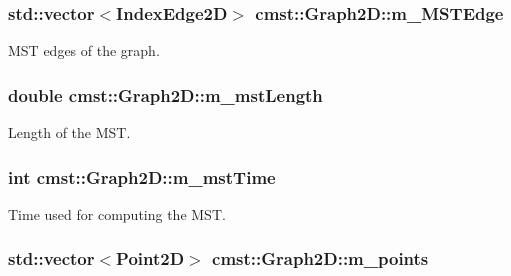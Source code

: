 \subsubsection[{\texorpdfstring{m\_MSTEdge}{m_MSTEdge}}]{\setlength{\rightskip}{0pt plus 5cm}std::vector$<${\bf IndexEdge2D}$>$ cmst::Graph2D::m\_MSTEdge\hspace{0.3cm}{\ttfamily [protected]}}\hypertarget{classcmst_1_1_graph2_d_a1cc96b5251162964ac21f46955ac8271}{}\label{classcmst_1_1_graph2_d_a1cc96b5251162964ac21f46955ac8271}


MST edges of the graph. 

\subsubsection[{\texorpdfstring{m\_mstLength}{m_mstLength}}]{\setlength{\rightskip}{0pt plus 5cm}double cmst::Graph2D::m\_mstLength\hspace{0.3cm}{\ttfamily [private]}}\hypertarget{classcmst_1_1_graph2_d_a722498b25b96d26e68e378ba970d5e65}{}\label{classcmst_1_1_graph2_d_a722498b25b96d26e68e378ba970d5e65}


Length of the MST. 

\subsubsection[{\texorpdfstring{m\_mstTime}{m_mstTime}}]{\setlength{\rightskip}{0pt plus 5cm}int cmst::Graph2D::m\_mstTime\hspace{0.3cm}{\ttfamily [private]}}\hypertarget{classcmst_1_1_graph2_d_a447f3d36666c57d2f15bddc1e3126f1e}{}\label{classcmst_1_1_graph2_d_a447f3d36666c57d2f15bddc1e3126f1e}


Time used for computing the MST. 

\subsubsection[{\texorpdfstring{m\_points}{m_points}}]{\setlength{\rightskip}{0pt plus 5cm}std::vector$<${\bf Point2D}$>$ cmst::Graph2D::m\_points\hspace{0.3cm}{\ttfamily [protected]}}\hypertarget{classcmst_1_1_graph2_d_a32456f3c630e34a56ce3109183142c10}{}\label{classcmst_1_1_graph2_d_a32456f3c630e34a56ce3109183142c10}


